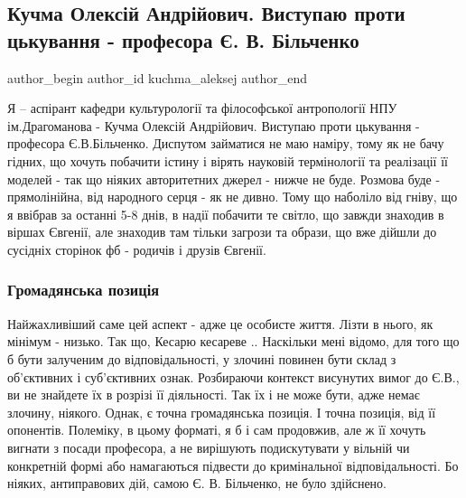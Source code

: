  
 
 
 
 
 
\subsection{Кучма Олексій Андрійович. Виступаю проти цькування - професора Є. В. Більченко}
\label{sec:28_01_2021.fb.kuchma_aleksej.1.bilchenko_evgenia_travlja}
\ifcmt
 author_begin
   author_id kuchma_aleksej
 author_end
\fi

Я – аспірант кафедри культурології та філософської антропології НПУ
ім.Драгоманова - Кучма Олексій Андрійович. Виступаю проти цькування - професора
Є.В.Більченко. Диспутом займатися не маю наміру, тому як не бачу гідних, що
хочуть побачити істину і вірять науковій термінології  та реалізації її моделей
- так що ніяких авторитетних джерел - нижче не буде. Розмова буде -
прямолінійна, від народного серця - як не дивно. Тому що наболіло від гніву, що
я ввібрав за останні 5-8 днів, в надії побачити те світло, що завжди знаходив в
віршах Євгенії, але знаходив там тільки загрози та образи, що вже дійшли до
сусідніх сторінок фб - родичів і друзів Євгенії. 

\subsubsection{Громадянська позиція}

Найжахливіший саме цей аспект - адже це особисте життя. Лізти в нього, як
мінімум - низько. Так що, Кесарю кесареве .. Наскільки мені відомо, для того що
б бути залученим до відповідальності, у злочині повинен бути склад з
об'єктивних і суб'єктивних ознак. Розбираючи контекст висунутих вимог до Є.В.,
ви не знайдете їх в розрізі її діяльності. Так їх і не може бути, адже немає
злочину, ніякого. Однак, є точна громадянська позиція. І точна позиція, від її
опонентів. Полеміку, в цьому форматі, я б і сам продовжив, але ж її хочуть
вигнати з посади професора, а не вирішують подискутувати у вільній чи
конкретній формі або намагаються підвести до кримінальної відповідальності. Бо
ніяких, антиправових дій, самою Є. В. Більченко, не було здійснено.

